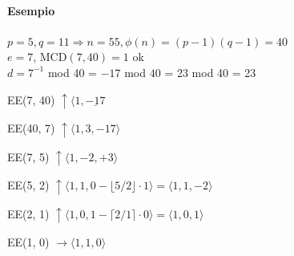 \documentclass[10pt]{book}
\begin{document}
\paragraph{Esempio} $p = 5, q = 11 \Rightarrow n = 55, \phi(n) = (p-1)(q-1) = 40$\\
$e = 7$, MCD$(7, 40) = 1$ ok\\
$d = 7^{-1}$ mod 40 = $-17$ mod $40$ = 23 mod 40 = 23
\begin{list}{}{}
	\item EE(7, 40) $\uparrow \langle1,\underline{-17}$
	\item EE(40, 7) $\uparrow \langle1,3,-17\rangle$
	\item EE(7, 5) $\uparrow \langle1,-2,+3\rangle$
	\item EE(5, 2) $\uparrow \langle1,1,0-\lfloor5/2\rfloor\cdot1\rangle = \langle1,1,-2\rangle$
	\item EE(2, 1) $\uparrow \langle1, 0, 1-\lceil2/1\rceil\cdot0\rangle = \langle1, 0, 1\rangle$
	\item EE(1, 0) $\rightarrow \langle1, 1, 0\rangle$
\end{list}
\end{document}
